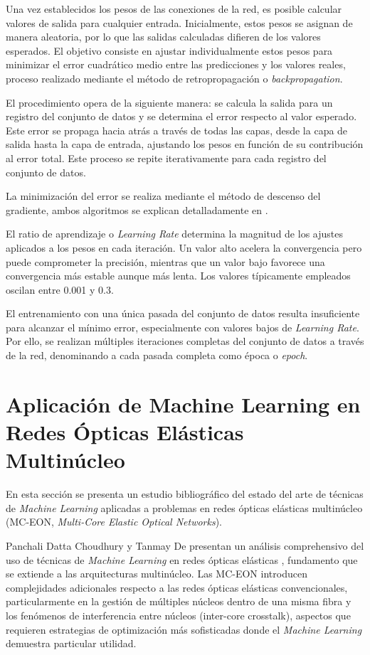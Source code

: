 Una vez establecidos los pesos de las conexiones de la red, es posible calcular valores de salida para cualquier entrada. Inicialmente, estos pesos se asignan de manera aleatoria, por lo que las salidas calculadas difieren de los valores esperados. El objetivo consiste en ajustar individualmente estos pesos para minimizar el error cuadrático medio entre las predicciones y los valores reales, proceso realizado mediante el método de retropropagación o \textit{backpropagation}.
%

El procedimiento opera de la siguiente manera: se calcula la salida para un registro del conjunto de datos y se determina el error respecto al valor esperado. Este error se propaga hacia atrás a través de todas las capas, desde la capa de salida hasta la capa de entrada, ajustando los pesos en función de su contribución al error total. Este proceso se repite iterativamente para cada registro del conjunto de datos.
%

La minimización del error se realiza mediante el método de descenso del gradiente, ambos algoritmos se explican detalladamente en \cite{[]}.
%

El ratio de aprendizaje o \textit{Learning Rate} determina la magnitud de los ajustes aplicados a los pesos en cada iteración. Un valor alto acelera la convergencia pero puede comprometer la precisión, mientras que un valor bajo favorece una convergencia más estable aunque más lenta. Los valores típicamente empleados oscilan entre 0.001 y 0.3.
%

El entrenamiento con una única pasada del conjunto de datos resulta insuficiente para alcanzar el mínimo error, especialmente con valores bajos de \textit{Learning Rate}. Por ello, se realizan múltiples iteraciones completas del conjunto de datos a través de la red, denominando a cada pasada completa como época o \textit{epoch}.
%

\section{Aplicación de Machine Learning en Redes Ópticas Elásticas Multinúcleo}
%

En esta sección se presenta un estudio bibliográfico del estado del arte de técnicas de \textit{Machine Learning} aplicadas a problemas en redes ópticas elásticas multinúcleo (MC-EON, \textit{Multi-Core Elastic Optical Networks}).
%

Panchali Datta Choudhury y Tanmay De presentan un análisis comprehensivo del uso de técnicas de \textit{Machine Learning} en redes ópticas elásticas \cite{[]}, fundamento que se extiende a las arquitecturas multinúcleo. Las MC-EON introducen complejidades adicionales respecto a las redes ópticas elásticas convencionales, particularmente en la gestión de múltiples núcleos dentro de una misma fibra y los fenómenos de interferencia entre núcleos (inter-core crosstalk), aspectos que requieren estrategias de optimización más sofisticadas donde el \textit{Machine Learning} demuestra particular utilidad.
%

